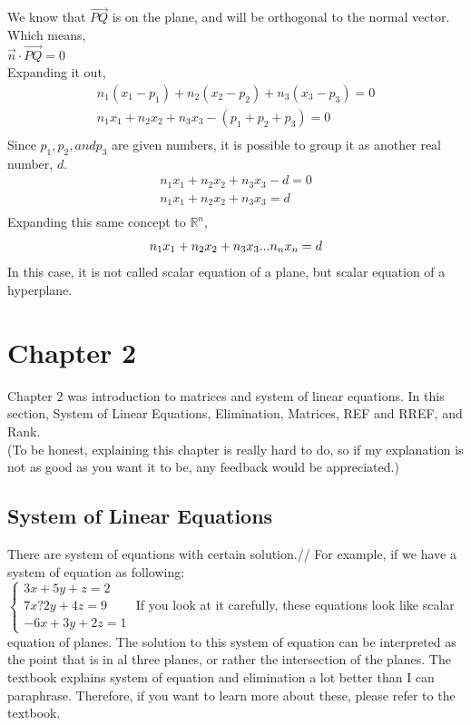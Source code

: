 \documentclass[12pt]{article}
\newcommand{\R}{\mathbb{R}}
\begin{document}
We know that $\vec{PQ}$ is on the plane, and will be orthogonal to the normal vector. Which means,\\
$\vec{n} \cdot \vec{PQ} = 0$\\
Expanding it out, 
\begin{equation}
\begin{split}
n_1(x_1-p_1)+n_2(x_2-p_2)+n_3(x_3-p_3)=0\\
n_1x_1 + n_2x_2 +n_3x_3 - (p_1+p_2+p_3)= 0\\
\end{split}
\end{equation} 
Since $p_1,p_2, and p_3$ are given numbers, it is possible to group it as another real number, $d$.\\
\begin{equation}
\begin{split}
n_1x_1 + n_2x_2 +n_3x_3 - d = 0\\
n_1x_1 + n_2x_2 +n_3x_3 = d\\
\end{split}
\end{equation}
Expanding this same concept to $\R^n$,
\begin{equation}
n_1x_1 + n_2x_2 +n_3x_3...n_nx_n = d\\
\end{equation}
In this case, it is not called scalar equation of a plane, but scalar equation of a hyperplane.

\section{Chapter 2}
Chapter 2 was introduction to matrices and system of linear equations. In this section, System of Linear Equations, Elimination, Matrices, REF and RREF, and Rank.\\
(To be honest, explaining this chapter is really hard to do, so if my explanation is not as good as you want it to be, any feedback would be appreciated.)

\subsection{System of Linear Equations}
There are system of equations with certain solution.//
For example, if we have a system of equation as following:\\
$\begin{cases} 3x + 5y + z = 2\\ 7x ? 2y + 4z = 9 \\ -6x + 3y + 2z = 1\end{cases}$
If you look at it carefully, these equations look like scalar equation of planes. The solution to this system of equation can be interpreted as the point that is in al three planes, or rather the intersection of the planes. 
The textbook explains system of equation and elimination a lot better than I can paraphrase. Therefore, if you want to learn more about these, please refer to the textbook.
\end{document}
